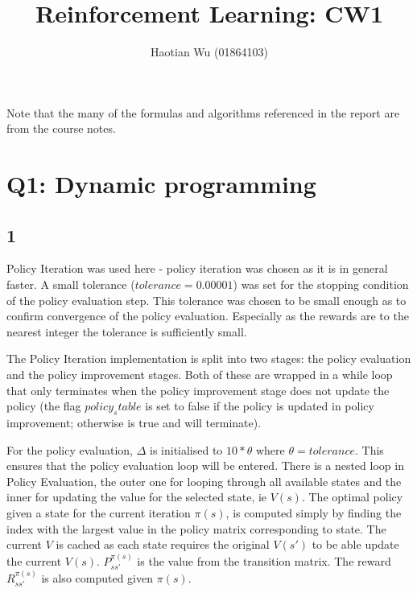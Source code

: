 \documentclass[12pt,a4paper]{report}
\title{Reinforcement Learning: CW1}
\author{Haotian Wu (01864103)}
\begin{document}
\maketitle

Note that the many of the formulas and algorithms referenced in the 
report are from the course notes.

\section*{Q1: Dynamic programming}
\subsection*{1}
Policy Iteration was used here - policy iteration was chosen as 
it is in general faster.
A small tolerance ($tolerance = 0.00001$) was set for the 
stopping condition of the policy evaluation step. This 
tolerance was chosen to be small enough as to confirm convergence 
of the policy evaluation. Especially as the rewards are to the 
nearest integer the tolerance is sufficiently small.

The Policy Iteration implementation is split into two
stages: the policy evaluation and the policy improvement stages.
Both of these are wrapped in a while loop that only terminates 
when the policy improvement stage does not update the policy 
(the flag $policy_stable$ is set to false if the policy is updated
in policy improvement; otherwise is true and will terminate).

For the policy evaluation, $\Delta$ is initialised to $10 * \theta$ 
where $\theta = tolerance$. This ensures that the policy evaluation
loop will be entered. 
There is a nested loop in Policy Evaluation, the outer one for looping 
through all available states and the inner for updating the value 
for the selected state, ie $V(s)$.
The optimal policy given a state for the current iteration $\pi(s)$,
is computed simply by finding the index with the largest value
in the policy matrix corresponding to state.
The current $V$ is cached as each state requires the original
$V(s')$ to be able update the current $V(s)$.
$P^{\pi(s)}_{s s'}$ is the value from the transition matrix. 
The reward $R^{\pi(s)}_{s s'}$ is also computed given $\pi(s)$.
\end{document}

